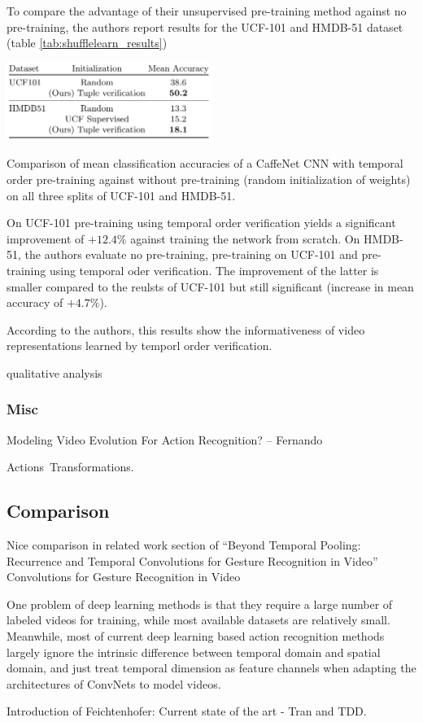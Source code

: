 To compare the advantage of their unsupervised pre-training method against no pre-training, the authors report results for the UCF-101 and HMDB-51 dataset (table \ref{tab:shufflelearn_results})

\begin{table}[H]
    \centering
    \includegraphics[width=0.5\textwidth]{img_deep/shufflelearn_results}
    \caption{Comparison of mean classification accuracies of a CaffeNet CNN with temporal order pre-training against without pre-training (random initialization of weights) on all three splits of UCF-101 and HMDB-51. \cite{misra_shuffle_2016}}
    \label{tab:shufflelearn_results}
\end{table}

On UCF-101 pre-training using temporal order verification yields a significant improvement of $+12.4\%$ against training the network from scratch.
On HMDB-51, the authors evaluate no pre-training, pre-training on UCF-101 and pre-training using temporal oder verification. The improvement of the latter is smaller compared to the reulsts of UCF-101 but still significant (increase in mean accuracy of $+4.7\%$).

According to the authors, this results show the informativeness of video representations learned by temporl order verification.

qualitative analysis

\subsubsection{Misc}
Modeling Video Evolution For Action Recognition? -- Fernando

Actions~Transformations.

\subsection{Comparison}
Nice comparison in related work section of ``Beyond Temporal Pooling:  Recurrence and Temporal Convolutions for Gesture Recognition in Video''
Convolutions for Gesture Recognition in Video

One problem of deep learning methods is that they require a large number of labeled videos for training, while most available datasets are relatively small.
Meanwhile, most of current deep learning based action recognition methods largely ignore the intrinsic difference between temporal domain and spatial domain, and just treat temporal dimension as feature channels when adapting the architectures of ConvNets to model videos.

Introduction of Feichtenhofer: Current state of the art - Tran and TDD.
